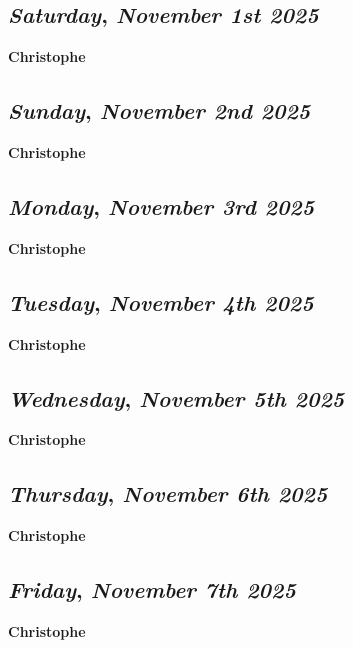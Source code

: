\begin{center}
\section*{\month}
\end{center}

\def\day{\textit{November 1st 2025}}
\def\weekday{\textit{Saturday}}
\subsection*{\weekday, \day}
\textbf {Christophe}

\def\day{\textit{November 2nd 2025}}
\def\weekday{\textit{Sunday}}
\subsection*{\weekday, \day}
\textbf {Christophe}

\def\day{\textit{November 3rd 2025}}
\def\weekday{\textit{Monday}}
\subsection*{\weekday, \day}
\textbf {Christophe}

\def\day{\textit{November 4th 2025}}
\def\weekday{\textit{Tuesday}}
\subsection*{\weekday, \day}
\textbf {Christophe}

\def\day{\textit{November 5th 2025}}
\def\weekday{\textit{Wednesday}}
\subsection*{\weekday, \day}
\textbf {Christophe}

\def\day{\textit{November 6th 2025}}
\def\weekday{\textit{Thursday}}
\subsection*{\weekday, \day}
\textbf {Christophe}

\def\day{\textit{November 7th 2025}}
\def\weekday{\textit{Friday}}
\subsection*{\weekday, \day}
\textbf {Christophe}

\def\day{\textit{November 8th 2025}}
\def\weekday{\textit{Saturday}}
